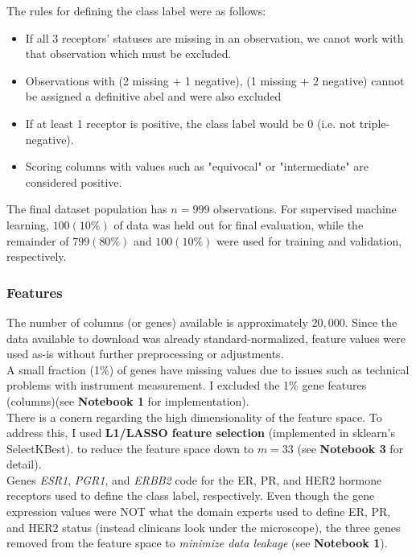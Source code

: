 \documentclass[11pt]{diazessay}
\begin{document}
The rules for defining the class label were as follows:

\begin{itemize}
	\item If all 3 receptors' statuses are missing in an observation, we canot work with that observation which must be excluded.
	\item Observations with (2 missing + 1 negative), (1 missing + 2 negative) cannot be assigned a definitive abel and were also excluded
	\item If at least 1 receptor is positive, the class label would be 0 (i.e. not triple-negative).
	\item Scoring columns with values such as "equivocal" or "intermediate" are considered positive.
\end{itemize}

The final dataset population has $n=999$ observations. For supervised machine learning, $100 (10\%)$ of data was held out for final evaluation, while  the remainder of $799 (80\%)$ and $100 (10\%)$ were used for training and validation, respectively. 

\subsubsection{Features}

The number of columns (or genes) available is approximately $20,000$. Since the data available to download was already standard-normalized, feature values were used as-is without further preprocessing or adjustments.\\

A small fraction (1\%) of genes have missing values due to issues such as technical problems with instrument measurement. I excluded the 1\% gene features (columns)(see \textbf{Notebook 1} for implementation). \\

There is a conern regarding the high dimensionality of the feature space.  To address this, I used \textbf{L1/LASSO feature selection} (implemented in sklearn's SelectKBest). to reduce the feature space down to $m=33$ (see \textbf{Notebook 3} for detail). \\

Genes \textit{ESR1}, \textit{PGR1}, and \textit{ERBB2} code for the ER, PR, and HER2 hormone receptors used to define the class label, respectively. Even though the gene expression values were NOT what the domain experts used to define ER, PR, and HER2 status (instead clinicans look under the microscope), the three genes removed from the feature space to 
\textit{minimize data leakage} (see \textbf{Notebook 1}). \\
\end{document}
